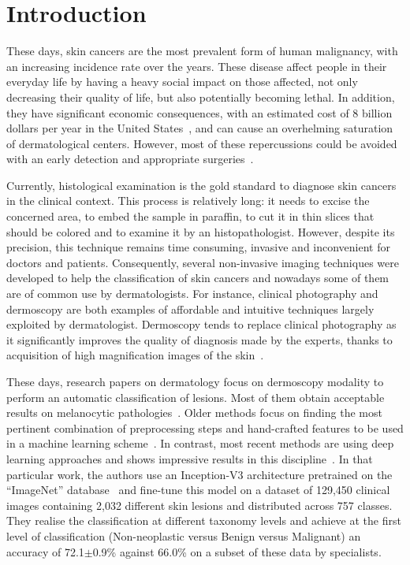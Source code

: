 \documentclass[journal,article,submit,moreauthors,pdftex, applsci]{Definitions/mdpi}
\begin{document}

\section{Introduction}
These days, skin cancers are the most prevalent form of human malignancy, with an increasing incidence rate over the years. These disease affect people in their everyday life by having a heavy social impact on those affected, not only decreasing their quality of life, but also potentially becoming lethal. In addition, they have significant economic consequences, with an estimated cost of 8 billion dollars per year in the United States~\cite{Farberg2017a}, and can cause an overhelming saturation of dermatological centers. However, most of these repercussions could be avoided with an early detection and appropriate surgeries~\cite{Farberg2017a}.\par
Currently, histological examination is the gold standard to diagnose skin cancers in the clinical context. This process is relatively long: it needs to excise the concerned area, to embed the sample in paraffin, to cut it in thin slices that should be colored and to examine it by an histopathologist. However, despite its precision, this technique remains time consuming, invasive and inconvenient for doctors and patients. Consequently, several non-invasive imaging techniques were developed to help the classification of skin cancers and nowadays some of them are of common use by dermatologists. For instance, clinical photography and dermoscopy are both examples of affordable and intuitive techniques largely exploited by dermatologist. Dermoscopy tends to replace clinical photography as it significantly improves the quality of diagnosis made by the experts, thanks to acquisition of high magnification images of the skin~\cite{Sinz2017}.\par
These days, research papers on dermatology focus on dermoscopy modality to perform an automatic classification of lesions. Most of them obtain acceptable results on melanocytic pathologies~\cite{Iyatomi2010}. Older methods focus on finding the most pertinent combination of preprocessing steps and hand-crafted features to be used in a machine learning scheme~\cite{Rastgoo2015,Pathan2018}. In contrast, most recent methods are using deep learning approaches and shows impressive results in this discipline~\cite{Esteva2017}. In that particular work, the authors use an Inception-V3 architecture pretrained on the “ImageNet” database~\cite{Deng2008} and fine-tune this model on a dataset of 129,450 clinical images containing 2,032 different skin lesions and distributed across 757 classes. They realise the classification at different taxonomy levels and achieve at the first level of classification (Non-neoplastic versus Benign versus Malignant) an accuracy of 72.1$\pm$0.9\% against 66.0\% on a subset of these data by specialists.\par
\end{document}
